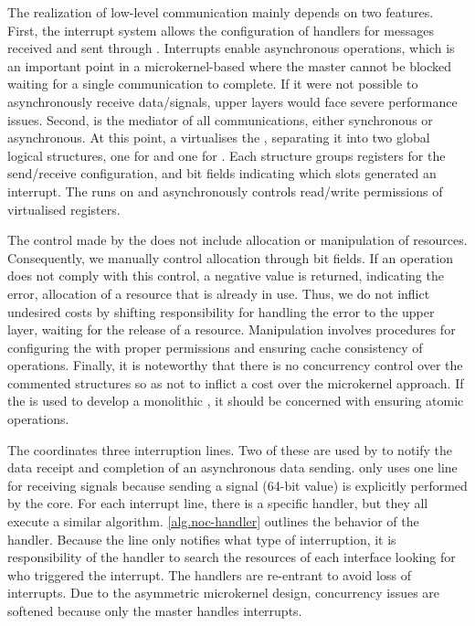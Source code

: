 			The realization of low-level communication mainly depends on two \mppa features.
			First, the interrupt system allows the configuration of handlers for messages
			received and sent through \noc. Interrupts enable asynchronous operations,
			which is an important point in a microkernel-based \os where the
			master cannot be blocked waiting for a single communication to complete.
			If it were not possible to asynchronously receive
			data/signals, upper layers would face severe performance issues. Second,
			\dma is the mediator of all communications, either synchronous or asynchronous.
			At this point, a \hypervisor virtualises the \dma, separating it into two global
			logical structures, one for \cnoc and one for \dnoc. Each structure groups
			registers for the send/receive configuration, and bit fields indicating which
			slots generated an interrupt. The \hypervisor runs on \rms and asynchronously
			controls read/write permissions of virtualised registers.

			The control made by the \hypervisor does not include allocation or manipulation
			of resources. Consequently, we manually control allocation through bit fields.
			If an operation does not comply with this control, a negative value is returned,
			indicating the error, \eg allocation of a resource that is already in use.
			Thus, we do not inflict undesired costs by shifting responsibility for handling
			the error to the upper layer, \eg waiting for the release of a resource.
			Manipulation involves procedures for configuring the \dma with proper
			permissions and ensuring cache consistency of operations. Finally, it is
			noteworthy that there is no concurrency control over the commented
			structures so as not to inflict a cost over the microkernel approach.
			If the \nanvixhal is used to develop a monolithic \os, it should be
			concerned with ensuring atomic operations.

			The \dma coordinates three interruption lines. Two of these are used by
			\dnoc to notify the data receipt and completion of an asynchronous data
			sending. \cnoc only uses one line for receiving signals because
			sending a signal (64-bit value) is explicitly performed by the core.
			For each interrupt line, there is a specific handler, but they all
			execute a similar algorithm. \autoref{alg.noc-handler} outlines
			the behavior of the \noc handler. Because the line only notifies what
			type of interruption, it is responsibility of the handler to search
			the resources of each interface looking for who triggered the interrupt.
			The handlers are re-entrant to avoid loss of interrupts. Due to the
			asymmetric microkernel design, concurrency issues are softened because only
			the master handles interrupts.

